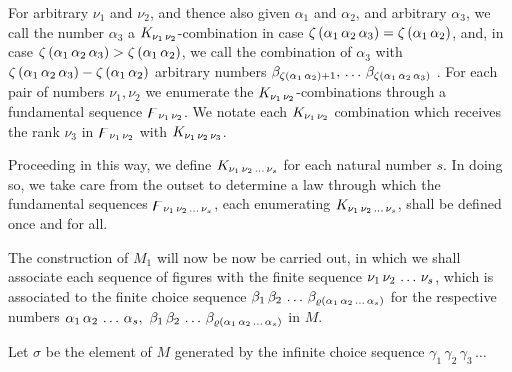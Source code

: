 \documentclass{amsart}
\newcommand\Rank[1]{\varrho\left(#1\right)}
\newcommand\Max[1]{\zeta\left(#1\right)}
\begin{document}
For arbitrary $\nu_1$ and $\nu_2$, and thence also given $\alpha_1$ and
$\alpha_2$, and arbitrary $\alpha_3$, we call the number $\alpha_3$ a
$K_{\Sequence{\nu_1,\nu_2}}$-combination in case $\Max{\Sequence{\alpha_1,\alpha_2,\alpha_3}} =
\Max{\Sequence{\alpha_1,\alpha_2}}$, and, in case $\Max{\Sequence{\alpha_1,\alpha_2,\alpha_3}} >
\Max{\Sequence{\alpha_1,\alpha_2}}$, we  call the combination of
$\alpha_3$ with $\Max{\Sequence{\alpha_1,\alpha_2,\alpha_3}} - \Max{\Sequence{\alpha_1,\alpha_2}}$
arbitrary numbers $\beta_{\Max{\Sequence{\alpha_1,\alpha_2}} +
1},\,\dots\,\beta_{\Max{\Sequence{\alpha_1,\alpha_2,\alpha_3}}}$ . For each pair of numbers $\nu_1,
\nu_2$ we enumerate the $K_{\Sequence{\nu_1,\nu_2}}$-combinations through a
fundamental sequence $\digamma_{\Sequence{\nu_1,\nu_2}}$. We notate each
$K_{\Sequence{\nu_1,\nu_2}}$ combination which receives the rank $\nu_3$ in
$\digamma_{\Sequence{\nu_1,\nu_2}}$ with $K_{\Sequence{\nu_1,\nu_2,\nu_3}}$.

Proceeding in this way, we define $K_{\Sequence{\nu_1,\nu_2,\dots,\nu_s}}$ for each natural
number $s$. In doing so, we take care from the outset to determine a
law through which the fundamental sequences $\digamma_{\Sequence{\nu_1,\nu_2,\dots,\nu_s}}$,
each enumerating $K_{\Sequence{\nu_1,\nu_2,\dots,\nu_s}}$, shall be defined once and for all.

The construction of $M_1$ will now be now be carried out, in which we shall
associate each sequence of figures with the finite sequence
$\Sequence{\nu_1,\nu_2,\dots,\nu_s}$, which is associated to the finite choice sequence
$\Sequence{\beta_1,\beta_2,\dots,\beta_{\Rank{\Sequence{\alpha_1,\alpha_2,\dots,\alpha_s}}}}$
for the respective numbers $\Sequence{\alpha_1,\alpha_2,\dots,\alpha_s},\
\Sequence{\beta_1,\beta_2,\dots,\beta_{\Rank{\Sequence{\alpha_1,\alpha_2,\dots,\alpha_s}}}}$
in $M$.

\bigskip

Let $\sigma$ be the element of $M$ generated by the infinite choice sequence $\gamma_1\,\gamma_2\,\gamma_3\,\dots$
\end{document}
